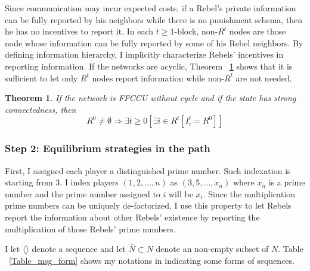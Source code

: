 \documentclass[12pt,letterpaper]{article}
\newtheorem*{main result}{Main Result}
\newtheorem{theorem}{Theorem}
\theoremstyle{definition}
\theoremstyle{remark}
\theoremstyle{claim}
\begin{document}
Since communication may incur expected costs, if a Rebel's private information can be fully reported by his neighbors while there is no punishment schema, then he has no incentives to report it. In each $t\geq 1$-block, non-$R^t$ nodes are those node whose information can be fully reported by some of his Rebel neighbors. By defining information hierarchy, I implicitly characterize Rebels' incentives in reporting information. If the networks are acyclic, Theorem ~\ref{lemma_empty} shows that it is sufficient to let only $R^t$ nodes report information while non-$R^t$ are not needed. 
\begin{theorem}
\label{lemma_empty}
If the network is FFCCU without cycle and if the state has strong connectedness, then 
\[R^0\neq \emptyset \Rightarrow \exists t\geq 0[\exists i\in R^t[I^t_i=R^0]]\]
\end{theorem}



\subsubsection{Step 2: Equilibrium strategies in the path}


First, I assigned each player a distinguished prime number. Such indexation is starting from $3$. I index players $(1,2,...,n)$ as $(3,5,...,x_n)$ where $x_n$ is a prime number and the prime number assigned to $i$ will be $x_i$. Since the multiplication prime numbers can be uniquely de-factorized, I use this property to let Rebels report the information about other Rebels' existence by reporting the multiplication of those Rebels' prime numbers.

I let $\langle\rangle$ denote a sequence and let $\bar{N}\subset N$ denote an non-empty subset of $N$. Table ~\ref{Table_msg_form} shows my notations in indicating some forms of sequences. 
\end{document}
